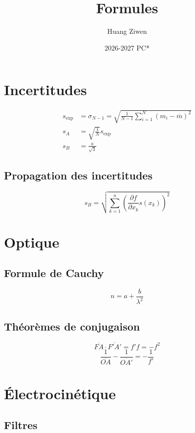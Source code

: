 \documentclass[]{article}
\title{Formules}
\author{Huang Ziwen}
\date{2026-2027 PC*}
\begin{document}
\section{Incertitudes}

\begin{align*}
    s_{\text{exp}} &= \sigma_{N-1} = \sqrt{\frac{1}{N-1}\sum_{i=1}^{N}(m_i-\overline{m})^2} \\
    s_A &= \sqrt{\frac{1}{N}}s_{\text{exp}} \\
    s_B &= \frac{a}{\sqrt{3}}
\end{align*}

\subsection*{Propagation des incertitudes}

\[ s_B = \sqrt{\sum_{k=1}^{n}(\frac{\partial f}{\partial x_k}s(x_k))^2} \]

\section{Optique}

\subsection*{Formule de Cauchy}

\[ n = a + \frac{b}{\lambda^2} \]

\subsection*{Théorèmes de conjugaison}

\[\overline{FA} \cdot \overline{F'A'} = f'f=-f^2\]
\[ \frac{1}{\overline{OA}}-\frac{1}{\overline{OA'}} = -\frac{1}{f'} \]

\section{Électrocinétique}

\subsection*{Filtres}
\end{document}
